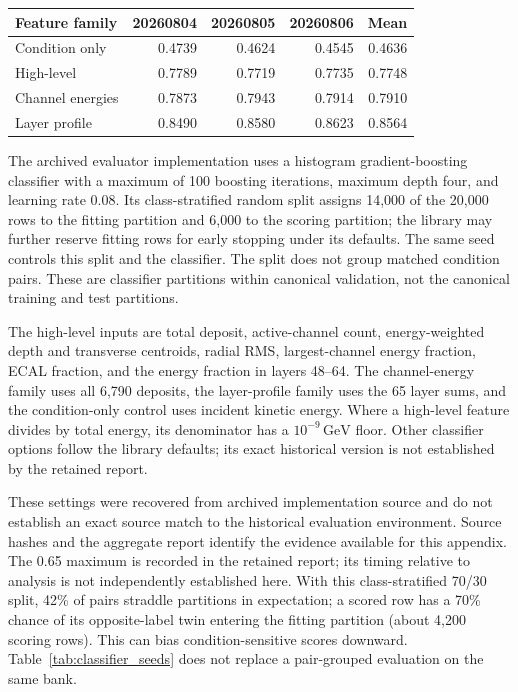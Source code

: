 \documentclass[11pt]{article}
\newcommand{\GeV}{\,\mathrm{GeV}}
\begin{document}
\begin{center}
\begin{minipage}{\linewidth}
\centering
{}
\label{tab:classifier_seeds}
\small
\begin{tabular}{@{}lrrrr@{}}
\toprule
Feature family & 20260804 & 20260805 & 20260806 & Mean \\
\midrule
Condition only & 0.4739 & 0.4624 & 0.4545 & 0.4636 \\
High-level & 0.7789 & 0.7719 & 0.7735 & 0.7748 \\
Channel energies & 0.7873 & 0.7943 & 0.7914 & 0.7910 \\
Layer profile & 0.8490 & 0.8580 & 0.8623 & 0.8564 \\
\bottomrule
\end{tabular}
\end{minipage}
\end{center}

The archived evaluator implementation uses a histogram gradient-boosting classifier with a maximum of 100 boosting iterations, maximum depth four, and learning rate 0.08. Its class-stratified random split assigns 14,000 of the 20,000 rows to the fitting partition and 6,000 to the scoring partition; the library may further reserve fitting rows for early stopping under its defaults. The same seed controls this split and the classifier. The split does not group matched condition pairs. These are classifier partitions within canonical validation, not the canonical training and test partitions.

The high-level inputs are total deposit, active-channel count, energy-weighted depth and transverse centroids, radial RMS, largest-channel energy fraction, ECAL fraction, and the energy fraction in layers 48--64. The channel-energy family uses all 6,790 deposits, the layer-profile family uses the 65 layer sums, and the condition-only control uses incident kinetic energy. Where a high-level feature divides by total energy, its denominator has a $10^{-9}\GeV$ floor. Other classifier options follow the library defaults; its exact historical version is not established by the retained report.

These settings were recovered from archived implementation source and do not establish an exact source match to the historical evaluation environment. Source hashes and the aggregate report identify the evidence available for this appendix. The 0.65 maximum is recorded in the retained report; its timing relative to analysis is not independently established here. With this class-stratified 70/30 split, 42\% of pairs straddle partitions in expectation; a scored row has a 70\% chance of its opposite-label twin entering the fitting partition (about 4,200 scoring rows). This can bias condition-sensitive scores downward. Table~\ref{tab:classifier_seeds} does not replace a pair-grouped evaluation on the same bank.

\clearpage
\printbibliography
\end{document}

